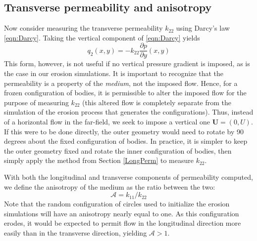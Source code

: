\documentclass[3p]{elsarticle}
\newcommand{\UU}{{\mathbf{U}}}
\newcommand{\pderiv}[2]{\frac{\partial #1}{\partial #2}}
\newcommand{\anis}{\mathcal{A}}
\begin{document}
\subsection{Transverse permeability and anisotropy}

Now consider measuring the transverse permeability $k_{22}$ using Darcy's law \eqref{eqn:Darcy}. Taking the vertical component of \eqref{eqn:Darcy} yields
\begin{equation}
\label{q1}
q_2(x,y) = -k_{22} \pderiv{p}{y}(x,y)
\end{equation}
This form, however, is not useful if no vertical pressure gradient is imposed, as is the case in our erosion simulations. It is important to recognize that the permeability is a property of the {\em medium}, not the imposed flow. Hence, for a frozen configuration of bodies, it is permissible to alter the imposed flow for the purpose of measuring $k_{22}$ (this altered flow is completely separate from the simulation of the erosion process that generates the configurations). Thus, instead of a horizontal flow in the far-field, we seek to impose a vertical one $\UU = (0,U)$.
If this were to be done directly, the outer geometry would need to rotate by 90 degrees about the fixed configuration of bodies. In practice, it is simpler to keep the outer geometry fixed and rotate the inner configuration of bodies, then simply apply the method from Section \ref{LongPerm} to measure $k_{22}$.

With both the longitudinal and transverse components of permeability computed, we define the anisotropy of the medium as the ratio between the two:
\begin{equation}
\anis = k_{11} / k_{22}
\end{equation}
Note that the random configuration of circles used to initialize the erosion simulations will have an anisotropy nearly equal to one. As this configuration erodes, it would be expected to permit flow in the longitudinal direction more easily than in the transverse direction, yielding $\anis > 1$.
\end{document}
